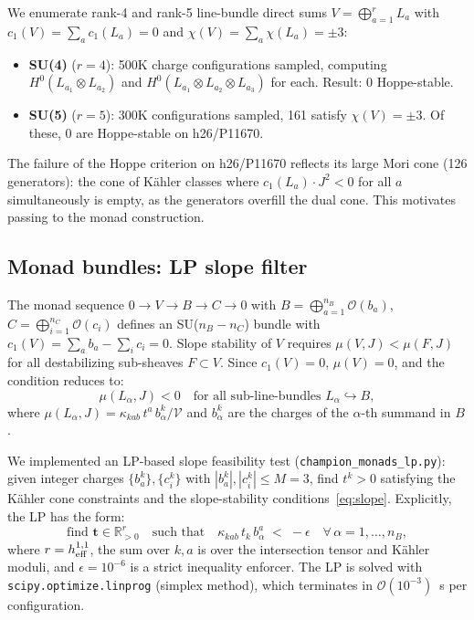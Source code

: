 \documentclass[11pt,a4paper]{article}
\newcommand{\bR}{\mathbb{R}}
\newcommand{\cO}{\mathcal{O}}
\begin{document}
We enumerate rank-4 and rank-5 line-bundle direct sums
$V = \bigoplus_{a=1}^r L_a$ with $c_1(V)=\sum_a c_1(L_a)=0$ and
$\chi(V) = \sum_a \chi(L_a) = \pm 3$:
\begin{itemize}[noitemsep]
  \item \textbf{SU(4)} ($r=4$): 500K charge configurations sampled,
    computing $H^0(L_{a_1}\otimes L_{a_2})$ and
    $H^0(L_{a_1}\otimes L_{a_2}\otimes L_{a_3})$ for each.
    Result: 0 Hoppe-stable.
  \item \textbf{SU(5)} ($r=5$): 300K configurations sampled,
    161 satisfy $\chi(V)=\pm 3$.
    Of these, 0 are Hoppe-stable on h26/P11670.
\end{itemize}
The failure of the Hoppe criterion on h26/P11670 reflects its large
Mori cone (126 generators): the cone of K\"{a}hler classes where
$c_1(L_a)\cdot J^2 < 0$ for all $a$ simultaneously is empty,
as the generators overfill the dual cone.
This motivates passing to the monad construction.

\subsection{Monad bundles: LP slope filter}

The monad sequence $0 \to V \to B \to C \to 0$ with
$B = \bigoplus_{a=1}^{n_B} \cO(b_a)$,
$C = \bigoplus_{i=1}^{n_C} \cO(c_i)$
defines an SU($n_B - n_C$) bundle with
$c_1(V) = \sum_a b_a - \sum_i c_i = 0$.
Slope stability of $V$ requires $\mu(V,J) < \mu(F,J)$ for all
destabilizing sub-sheaves $F\subset V$.  Since $c_1(V)=0$,
$\mu(V)=0$, and the condition reduces to:
\begin{equation}
  \mu(L_\alpha,J) < 0 \quad
  \text{for all sub-line-bundles }L_\alpha \hookrightarrow B,
  \label{eq:slope}
\end{equation}
where $\mu(L_\alpha, J) = \kappa_{kab}\,t^a\,b^k_\alpha / \mathcal{V}$
and $b^k_\alpha$ are the charges of the $\alpha$-th summand in $B$.

We implemented an LP-based slope feasibility test
(\texttt{champion\_monads\_lp.py}):
given integer charges $\{b^k_a\},\{c^k_i\}$ with $|b^k_a|,|c^k_i| \leq M=3$,
find $t^k > 0$ satisfying the Kähler cone constraints
and the slope-stability conditions~\eqref{eq:slope}.
Explicitly, the LP has the form:
\begin{equation}
  \text{find }\mathbf{t} \in \bR^r_{>0}
  \quad\text{such that}\quad
  \kappa_{kab}\,t_k\,b^a_\alpha \;<\; -\epsilon
  \quad \forall\, \alpha=1,\ldots,n_B,
  \label{eq:lp}
\end{equation}
where $r = h^{1,1}_{\rm eff}$, the sum over $k,a$ is over the
intersection tensor and Kähler moduli, and $\epsilon = 10^{-6}$
is a strict inequality enforcer.
The LP is solved with \texttt{scipy.optimize.linprog} (simplex
method), which terminates in $\cO(10^{-3})$~s per configuration.
\end{document}
